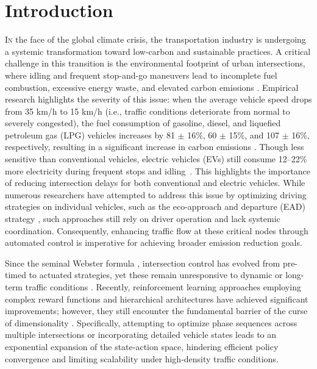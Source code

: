 \documentclass[journal]{IEEEtran}
\begin{document}
\section{Introduction}
\lettrine[lines=2, lraise=0.1, nindent=0em, findent=0.1em]{I}{n} 
the face of the global climate crisis, the transportation industry is undergoing a systemic transformation toward low-carbon and sustainable practices. A critical challenge in this transition is the environmental footprint of urban intersections, where idling and frequent stop-and-go maneuvers lead to incomplete fuel combustion, excessive energy waste, and elevated carbon emissions \cite{rakha2004}. Empirical research highlights the severity of this issue: when the average vehicle speed drops from 35 km/h to 15 km/h (i.e., traffic conditions deteriorate from normal to severely congested), the fuel consumption of gasoline, diesel, and liquefied petroleum gas (LPG) vehicles increases by 81 $\pm$ 16\%, 60 $\pm$ 15\%, and 107 $\pm$ 16\%, respectively, resulting in a significant increase in carbon emissions \cite{zhang2014}. Though less sensitive than conventional vehicles, electric vehicles (EVs) still consume 12--22\% more electricity during frequent stops and idling~\cite{wang2015}. This highlights the importance of reducing intersection delays for both conventional and electric vehicles. While numerous researchers have attempted to address this issue by optimizing driving strategies on individual vehicles, such as the eco-approach and departure (EAD) strategy \cite{ye2019}, such approaches still rely on driver operation and lack systemic coordination. Consequently, enhancing traffic flow at these critical nodes through automated control is imperative for achieving broader emission reduction goals.

Since the seminal Webster formula \cite{webster1958}, intersection control has evolved from pre-timed to actuated strategies, yet these remain unresponsive to dynamic or long-term traffic conditions \cite{yau2017}. Recently, reinforcement learning approaches employing complex reward functions \cite{wei2018} and hierarchical architectures \cite{tan2020} have achieved significant improvements; however, they still encounter the fundamental barrier of the curse of dimensionality \cite{yau2017}. Specifically, attempting to optimize phase sequences across multiple intersections or incorporating detailed vehicle states leads to an exponential expansion of the state-action space, hindering efficient policy convergence and limiting scalability under high-density traffic conditions. 
\end{document}
